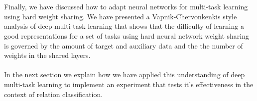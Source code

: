 \\\\
Finally, we have discussed how to adapt neural networks for multi-task learning using hard weight sharing. We have presented a Vapnik-Chervonkenkis style analysis of deep multi-task learning that shows that the difficulty of learning a good representations for a set of tasks using hard neural network weight sharing is governed by the amount of target and auxiliary data and the the number of weights in the shared layers.
\\\\
In the next section we explain how we have applied this understanding of deep multi-task learning to implement an experiment that tests it's effectiveness in the context of relation classification.